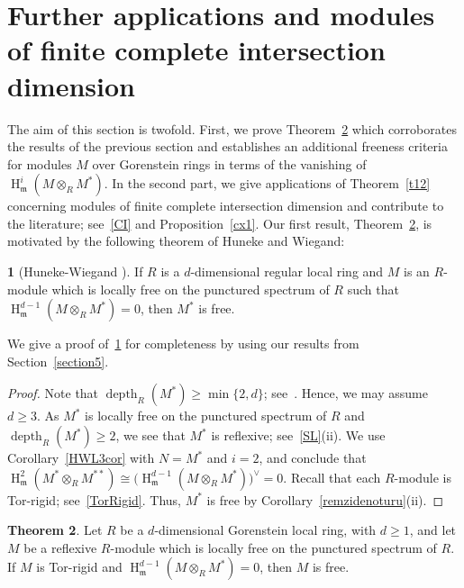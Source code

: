 \documentclass[11pt]{amsart}
\theoremstyle{definition}
\newtheorem{thm}{Theorem}[section]
\theoremstyle{definition}
\newtheorem{chunk}[thm]{\hspace*{-1.065ex}\bf}
\numberwithin{equation}{section}
\newcommand{\fm}{\mathfrak{m}}
\DeclareMathOperator{\depth}{depth}
\DeclareMathOperator{\hh}{H}
\begin{document}

\section{Further applications and modules of finite complete intersection dimension}\label{section6}

 The aim of this section is twofold. First, we prove Theorem~\ref{mainofsection} which corroborates the results of the previous section and establishes an additional freeness criteria for modules $M$ over Gorenstein rings in terms of the vanishing of $\hh^{i}_{\fm}(M\otimes_RM^*)$. In the second part, we give applications of Theorem~\ref{t12} concerning modules of finite complete intersection dimension and contribute to the literature; see~\ref{CI} and Proposition~\ref{cx1}. Our first result, Theorem~\ref{mainofsection}, is motivated by the following theorem of Huneke and Wiegand:

\begin{chunk} [{Huneke-Wiegand \cite[4.3]{HW1}}] \label{bildik} If $R$ is a $d$-dimensional regular local ring and $M$ is an $R$-module which is locally free on the punctured spectrum of $R$ such that $\hh^{d-1}_{\fm}(M\otimes_RM^*)=0$, then $M^{\ast}$ is free.
\end{chunk}

We give a proof of~\ref{bildik} for completeness by using our results from Section~\ref{section5}.

\begin{proof} Note that $\depth_R(M^{\ast})\geq \min\{2, d\}$; see~\cite[1.4.19]{BH}. Hence, we may assume $d\geq 3$. As $M^{\ast}$ is locally free on the punctured spectrum of $R$ and $\depth_R(M^{\ast})\geq 2$, we see that $M^{\ast}$ is reflexive; see~\ref{SL}(ii). We use Corollary~\ref{HWL3cor} with $N=M^{\ast}$ and $i=2$, and conclude that $\hh_{\fm}^{2}(M^\ast\otimes_RM^{\ast\ast})\cong \big(\hh_{\fm}^{d-1}(M \otimes_RM^{\ast} )\big)^{\vee}=0$. Recall that each $R$-module is Tor-rigid; see~\ref{TorRigid}. Thus, $M^{\ast}$ is free by Corollary~\ref{remzidenoturu}(ii).
\end{proof}
 
\begin{thm} \label{mainofsection} Let $R$ be a $d$-dimensional Gorenstein local ring, with $d\geq 1$, and let $M$ be a reflexive $R$-module which is locally free on the punctured spectrum of $R$. If $M$ is Tor-rigid and $\hh^{d-1}_{\fm}(M\otimes_RM^{\ast})=0$, then $M$ is free.
\end{thm}
\end{document}
